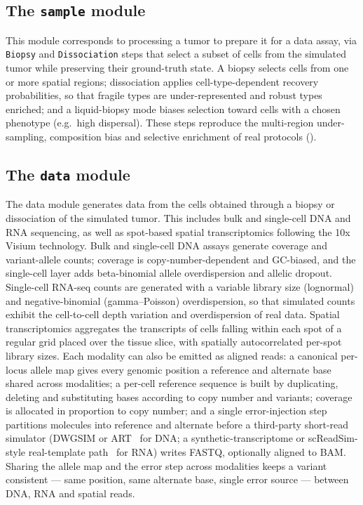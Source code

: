 \documentclass{article}
\begin{document}
\subsection{The \texttt{sample} module}
This module corresponds to processing a tumor to prepare it for a data assay, via
\texttt{Biopsy} and \texttt{Dissociation} steps that select a subset of cells from the
simulated tumor while preserving their ground-truth state. A biopsy selects cells from one or
more spatial regions; dissociation applies cell-type-dependent recovery probabilities, so that
fragile types are under-represented and robust types enriched; and a liquid-biopsy mode biases
selection toward cells with a chosen phenotype (e.g.\ high dispersal). These steps reproduce the
multi-region under-sampling, composition bias and selective enrichment of real protocols
().

\subsection{The \texttt{data} module}
The data module generates data from the cells obtained through a biopsy or dissociation of the
simulated tumor. This includes bulk and single-cell DNA and RNA sequencing, as well as
spot-based spatial transcriptomics following the 10x Visium technology. Bulk and single-cell
DNA assays generate coverage and variant-allele counts; coverage is copy-number-dependent and
GC-biased, and the single-cell layer adds beta-binomial allele overdispersion and allelic
dropout. Single-cell RNA-seq counts are generated with a variable library size (lognormal) and
negative-binomial (gamma--Poisson) overdispersion, so that simulated counts exhibit the
cell-to-cell depth variation and overdispersion of real data. Spatial transcriptomics
aggregates the transcripts of cells falling within each spot of a regular grid placed over the
tissue slice, with spatially autocorrelated per-spot library sizes. Each modality can also be
emitted as aligned reads: a canonical per-locus allele map gives every genomic position a
reference and alternate base shared across modalities; a per-cell reference sequence is built by
duplicating, deleting and substituting bases according to copy number and variants; coverage is
allocated in proportion to copy number; and a single error-injection step partitions molecules
into reference and alternate before a third-party short-read simulator (DWGSIM or
ART~\cite{huang_art_2012} for DNA; a synthetic-transcriptome or scReadSim-style real-template
path~\cite{yan_screadsim_2023} for RNA) writes FASTQ, optionally aligned to BAM. Sharing the
allele map and the error step across modalities keeps a variant consistent --- same position,
same alternate base, single error source --- between DNA, RNA and spatial reads.
\end{document}
